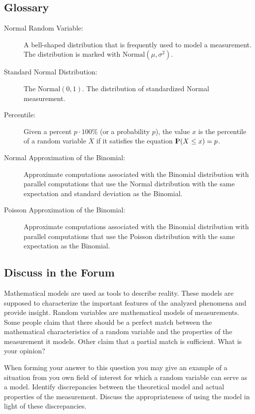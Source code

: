\documentclass[]{krantz}
\newcommand{\Prob}{{\rm I\kern-.3em P}}
\theoremstyle{definition}
\theoremstyle{definition}
\theoremstyle{definition}
\theoremstyle{remark}
\begin{document}
\subsection*{Glossary}\label{glossary}


\begin{description}
\item[Normal Random Variable:]
A bell-shaped distribution that is frequently used to model a
measurement. The distribution is marked with
\(\mathrm{Normal}(\mu,\sigma^2)\).
\item[Standard Normal Distribution:]
The \(\mathrm{Normal}(0,1)\). The distribution of standardized Normal
measurement.
\item[Percentile:]
Given a percent \(p \cdot 100\%\) (or a probability \(p\)), the value
\(x\) is the percentile of a random variable \(X\) if it satisfies the
equation \(\Prob(X \leq x) = p\).
\item[Normal Approximation of the Binomial:]
Approximate computations associated with the Binomial distribution with
parallel computations that use the Normal distribution with the same
expectation and standard deviation as the Binomial.
\item[Poisson Approximation of the Binomial:]
Approximate computations associated with the Binomial distribution with
parallel computations that use the Poisson distribution with the same
expectation as the Binomial.
\end{description}

\subsection*{Discuss in the Forum}\label{discuss-in-the-forum}


Mathematical models are used as tools to describe reality. These models
are supposed to characterize the important features of the analyzed
phenomena and provide insight. Random variables are mathematical models
of measurements. Some people claim that there should be a perfect match
between the mathematical characteristics of a random variable and the
properties of the measurement it models. Other claim that a partial
match is sufficient. What is your opinion?

When forming your answer to this question you may give an example of a
situation from you own field of interest for which a random variable can
serve as a model. Identify discrepancies between the theoretical model
and actual properties of the measurement. Discuss the appropriateness of
using the model in light of these discrepancies.
\end{document}
